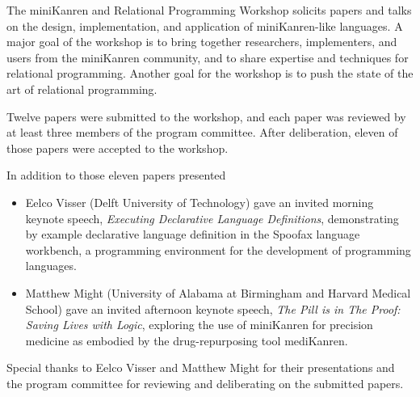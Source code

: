 \documentclass[oneside]{book}
\begin{document}
\vspace{5pt}
\noindent
The miniKanren and Relational Programming Workshop solicits papers and
talks on the design, implementation, and application of
miniKanren-like languages. A major goal of the workshop is to bring
together researchers, implementers, and users from the miniKanren
community, and to share expertise and techniques for relational
programming. Another goal for the workshop is to push the state of the
art of relational programming.

\vspace{5pt}
\noindent
Twelve papers were submitted to the workshop, and each paper was
reviewed by at least three members of the program committee.  After
deliberation, eleven of those papers were accepted to the workshop.

\vspace{5pt}
\noindent
In addition to those eleven papers presented
\begin{itemize}
\item Eelco Visser (Delft University of Technology) gave an invited
  morning keynote speech, \textit{Executing Declarative Language
  Definitions}, demonstrating by example declarative language
  definition in the Spoofax language workbench, a programming
  environment for the development of programming languages.
\item Matthew Might (University of Alabama at Birmingham and Harvard
  Medical School) gave an invited afternoon keynote speech, \textit{The Pill
  is in The Proof: Saving Lives with Logic}, exploring the use of
  miniKanren for precision medicine as embodied by the
  drug-repurposing tool mediKanren.
\end{itemize}

\vspace{5pt}
\noindent
Special thanks to Eelco Visser and Matthew Might for their
presentations and the program committee for reviewing and deliberating
on the submitted papers.
\end{document}
